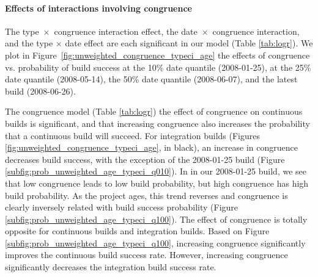 \paragraph{Effects of interactions involving congruence}
\label{sec:congruenceinteractions}
The type~$\times$~congruence interaction effect, the date~$\times$~congruence interaction, and the type $\times$ date effect are each significant in our model (Table \ref{tab:logr}). We plot in Figure~\ref{fig:unweighted_congruence_typeci_age} the effects of congruence vs. probability of build success at the 10\% date quantile (2008-01-25), at the 25\% date quantile (2008-05-14), the 50\% date quantile (2008-06-07), and the latest build (2008-06-26).


%  

The congruence model (Table \ref{tab:logr}) the effect of congruence on continuous builds is significant, and that increasing congruence also increases the probability that a continuous build will succeed. 
For integration builds (Figures \ref{fig:unweighted_congruence_typeci_age}, in black), an increase in congruence decreases build success, with the exception of the 2008-01-25 build (Figure \ref{subfig:prob_unweighted_age_typeci_q010}). In in our 2008-01-25 build, we see that low congruence leads to low build probability, but high congruence has high build probability. As the project ages, this trend reverses and congruence is clearly inversely related with build success probability (Figure \ref{subfig:prob_unweighted_age_typeci_q100}).
The effect of congruence is totally opposite for continuous builds and integration builds. Based on Figure \ref{subfig:prob_unweighted_age_typeci_q100}, increasing congruence significantly improves the continuous build success rate. However, increasing congruence significantly decreases the integration build success rate.


